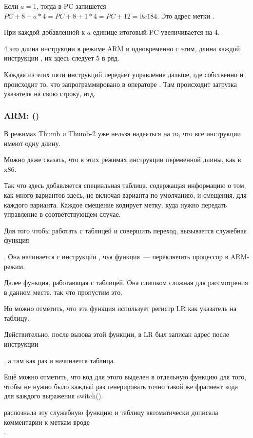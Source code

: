 Если $a=1$, тогда в \ac{PC} запишется 
$PC+8+a*4 = PC+8+1*4 = PC+12 = 0x184$. Это адрес метки .

При каждой добавленной к $a$ единице итоговый \ac{PC} увеличивается на 4.

4 это длина инструкции в режиме ARM и одновременно с этим, 
длина каждой инструкции , их здесь следует 5 в ряд.

Каждая из этих пяти инструкций  передает управление дальше, где собственно и происходит то, 
что запрограммировано в операторе .
Там происходит загрузка указателя на свою строку, итд.

\subsubsection{ARM: \OptimizingKeilVI (\ThumbMode)}



В режимах Thumb и Thumb-2 уже нельзя надеяться на то, что все инструкции имеют одну длину.

Можно даже сказать, что в этих режимах инструкции переменной длины, как в x86.

Так что здесь добавляется специальная таблица, содержащая информацию о том, как много вариантов здесь,
не включая варианта по умолчанию, и смещения, для каждого варианта. Каждое смещение кодирует метку, куда нужно передать
управление в соответствующем случае.

Для того чтобы работать с таблицей и совершить переход, вызывается служебная функция

. 
Она начинается с инструкции , чья функция~--- переключить процессор в ARM-режим.

Далее функция, работающая с таблицей. 
Она слишком сложная для рассмотрения в данном месте, так что пропустим это.


Но можно отметить, что эта функция использует регистр \ac{LR} как указатель на таблицу.

Действительно, после вызова этой функции, в \ac{LR} был записан адрес после инструкции

, а там как раз и начинается таблица.

Ещё можно отметить, что код для этого выделен в отдельную функцию для того, 
чтобы не нужно было каждый раз генерировать 
точно такой же фрагмент кода для каждого выражения switch().

\IDA распознала эту служебную функцию и таблицу автоматически дописала комментарии к меткам вроде \\
.


